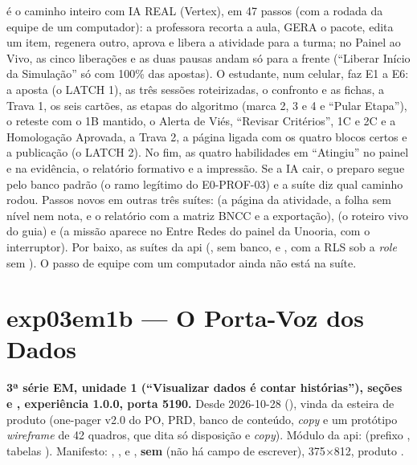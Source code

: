  é o caminho inteiro
com IA REAL (Vertex), em 47 passos (com a rodada da equipe de um computador): a professora recorta a aula, GERA o pacote,
edita um item, regenera outro, aprova e libera a atividade para a turma; no
Painel ao Vivo, as cinco liberações e as duas pausas andam só para a frente
(\enquote{Liberar Início da Simulação} só com 100\% das apostas). O
estudante, num celular, faz E1 a E6: a aposta (o LATCH 1), as três sessões
roteirizadas, o confronto e as fichas, a Trava 1, os seis cartões, as etapas
do algoritmo (marca 2, 3 e 4 e \enquote{Pular Etapa}), o reteste com o 1B
mantido, o Alerta de Viés, \enquote{Revisar Critérios}, 1C e 2C e a
Homologação Aprovada, a Trava 2, a página ligada com os quatro blocos certos
e a publicação (o LATCH 2). No fim, as quatro habilidades em
\enquote{Atingiu} no painel e na evidência, o relatório formativo e a
impressão. Se a IA cair, o preparo segue pelo banco padrão (o ramo legítimo do
E0-PROF-03) e a suíte diz qual caminho rodou. Passos novos em outras três
suítes:  (a página da
atividade, a folha sem nível nem nota, e o relatório com a matriz BNCC e a
exportação),  (o roteiro vivo do guia)
e  (a missão aparece no Entre Redes do painel da
Unooria, com o interruptor). Por baixo, as suítes da api
(, sem banco, e
, com a RLS sob a
\emph{role} sem ). O passo de equipe com um computador ainda
não está na suíte.

\section{exp03em1b --- O Porta-Voz dos Dados}
\label{sec:exp03em1b}

\textbf{3ª série EM, unidade 1 (\enquote{Visualizar dados é contar
histórias}), seções  e , experiência 1.0.0, porta
5190.} Desde 2026-10-28 (), vinda da esteira de produto
(one-pager v2.0 do PO, PRD, banco de conteúdo, \emph{copy} e um protótipo
\emph{wireframe} de 42 quadros, que dita só disposição e \emph{copy}). Módulo
da api:  (prefixo ,
tabelas ). Manifesto: , ,
 e , \textbf{sem}  (não há campo de
escrever), 375$\times$812, produto .

